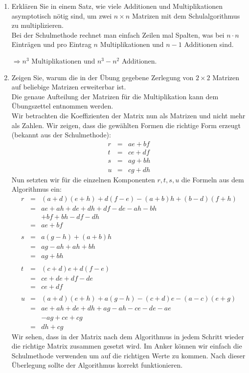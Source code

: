 \documentclass[11pt,a4paper,ngerman]{article}
\begin{document}
\begin{enumerate}[\bfseries (a)]

\item Erklären Sie in einem Satz, wie viele Additionen und Multiplikationen asymptotisch nötig sind, um zwei $n \times n$ Matrizen mit dem Schulalgorithmus zu multiplizieren.\\

Bei der Schulmethode rechnet man einfach Zeilen mal Spalten, was bei $n \cdot n$ Einträgen und pro Eintrag $n$ Multiplikationen und $n-1$ Additionen sind.

$\Rightarrow n^3$ Multiplikationen und $n^3 - n^2$ Additionen.

\item Zeigen Sie, warum die in der Übung gegebene Zerlegung von $2\times2$ Matrizen auf beliebige Matrizen erweiterbar ist.\\
Die genaue Aufteilung der Matrizen für die Multiplikation kann dem Übungszettel entnommen werden.\\

Wir betrachten die Koeffizienten der Matrix nun als Matrizen und nicht mehr als Zahlen. Wir zeigen, dass die gewählten Formen die richtige Form erzeugt (bekannt aus der Schulmethode):
$$
\begin{array}{rcl}
r &=& ae + bf\\
t &=& ce + df\\
s &=& ag + bh\\
u &=& cg + dh
\end{array}
$$
Nun setzten wir für die einzelnen Komponenten $r,t,s,u$ die Formeln aus dem Algorithmus ein:
$$
\begin{array}{rcl}
r &=& (a+d)(e+h) + d(f-e) - (a+b)h + (b-d)(f+h)\\
&=& ae + ah + de + dh + df - de - ah - bh\\
&& + bf + bh -df -dh\\
&=& ae + bf\\
&&\\
s &=& a (g - h) + (a+b)h\\
&=& ag - ah + ah + bh\\
&=& ag + bh\\
&&\\
t &=& (c+d)e + d(f-e)\\
&=& ce + de + df - de\\
&=& ce + df\\
&&\\
u &=& (a+d)(e+h)+a(g-h) - (c+d) e - (a-c)(e+g)\\
&=& ae + ah + de + dh + ag - ah - ce - de -ae\\
&& -ag +ce + cg\\
&=& dh + cg
\end{array}
$$
Wir sehen, dass in der Matrix nach dem Algorithmus in jedem Schritt wieder die richtige Matrix zusammen gesetzt wird. Im Anker können wir einfach die Schulmethode verwenden um auf die richtigen Werte zu kommen. Nach dieser Überlegung sollte der Algorithmus korrekt funktionieren.


\end{enumerate}
\end{document}
